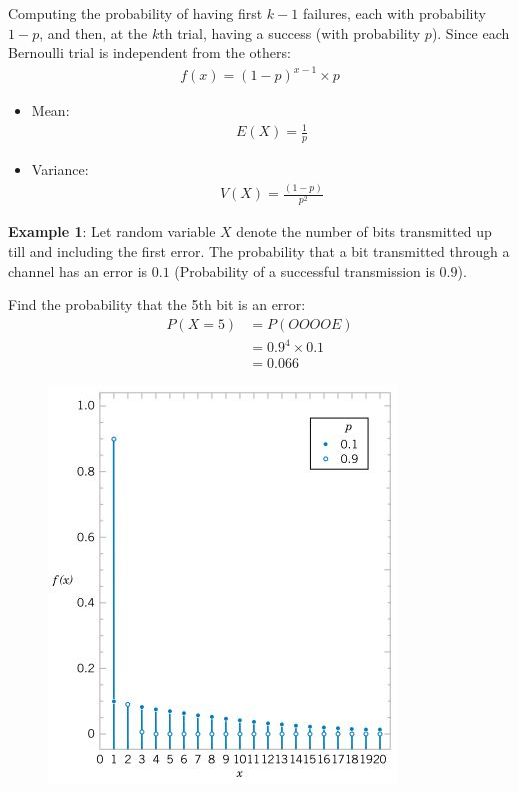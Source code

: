 \documentclass[10pt,a4paper]{article}
\begin{document}
Computing the probability of having first $k-1$ failures, each with probability $1-p$, and then, at
the $k$th trial, having a success (with probability $p$). Since each Bernoulli trial is independent
from the others:
\begin{align*}
    f(x) = (1 - p)^{x-1}\times p 
\end{align*}
\begin{itemize}
    \item Mean: 
    \begin{align*}
        E(X) = \frac{1}{p}
    \end{align*}
    \item Variance: 
    \begin{align*}
        V(X) = \frac{(1-p)}{p^2}
    \end{align*}
\end{itemize}

\textbf{Example 1}: Let random variable $X$ denote the number of bits transmitted up till and
including the first error. The probability that a bit transmitted through a channel has an error is
$0.1$ (Probability of a successful transmission is $0.9$). 

Find the probability that the 5th bit is an error:
\begin{align*}
    P(X=5) &= P(OOOOE) \\
    &= 0.9^4 \times 0.1 \\
    &= 0.066
\end{align*}

\pagebreak
\begin{figure} [h!]
    \centering
    \includegraphics[scale=.8]{GeoDis.JPG}
\end{figure}
\end{document}
